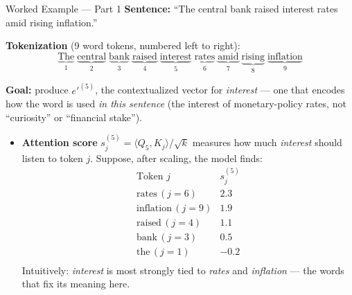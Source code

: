 \begin{frame}{Worked Example --- Part 1}
\small
\textbf{Sentence:} ``The central bank raised interest rates amid rising inflation.''

\smallskip
\textbf{Tokenization} (9 word tokens, numbered left to right):
\[
\underbrace{\text{The}}_{1}\;\underbrace{\text{central}}_{2}\;\underbrace{\text{bank}}_{3}\;\underbrace{\text{raised}}_{4}\;\underbrace{\text{interest}}_{5}\;\underbrace{\text{rates}}_{6}\;\underbrace{\text{amid}}_{7}\;\underbrace{\text{rising}}_{8}\;\underbrace{\text{inflation}}_{9}
\]

\smallskip
\textbf{Goal:} produce $e'^{(5)}$, the contextualized vector for \emph{interest} --- one that encodes how the word is used \emph{in this sentence} (the interest of monetary-policy rates, not ``curiosity'' or ``financial stake'').

\smallskip
\begin{itemize}
\item \textbf{Attention score} $s_{j}^{(5)} = \langle Q_{5}, K_{j}\rangle / \sqrt{k}$ measures how much \emph{interest} should listen to token $j$. Suppose, after scaling, the model finds:
\[
\begin{array}{l|c}
   \text{Token } j & s_{j}^{(5)} \\
   \hline
   \text{rates}\,(j=6) & 2.3 \\
   \text{inflation}\,(j=9) & 1.9 \\
   \text{raised}\,(j=4) & 1.1 \\
   \text{bank}\,(j=3) & 0.5 \\
   \text{the}\,(j=1) & -0.2 \\
\end{array}
\]
Intuitively: \emph{interest} is most strongly tied to \emph{rates} and \emph{inflation} --- the words that fix its meaning here.
\end{itemize}
\end{frame}

